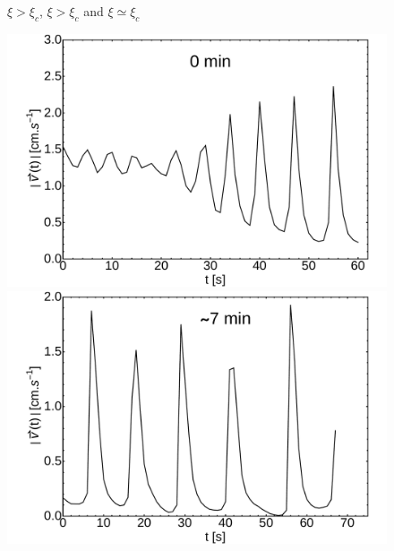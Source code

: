\documentclass[aps, twocolumn, floatfix, superscriptaddress]{revtex4}
\begin{document}
\begin{figure}[h!]
\begin{minipage}[c]{0.3\linewidth}
	\end{minipage}
	\caption{$\xi > \xi_{c}$, $\xi > \xi_{c}$ and $\xi \simeq \xi_{c}$}\label{fig:uvst_72dypcm}
\end{figure}
\begin{figure}[h!]
    \centering
	\begin{minipage}[c]{0.3\linewidth}
		\centering
		\includegraphics[width=\textwidth]{uvst_65dypcm_a.pdf}
	\end{minipage}
	\begin{minipage}[c]{0.3\linewidth}
		\centering
		\includegraphics[width=\textwidth]{uvst_65dypcm_b.pdf}
	\end{minipage}
	\begin{minipage}[c]{0.3\linewidth}

\end{minipage}
\end{figure}
\end{document}
